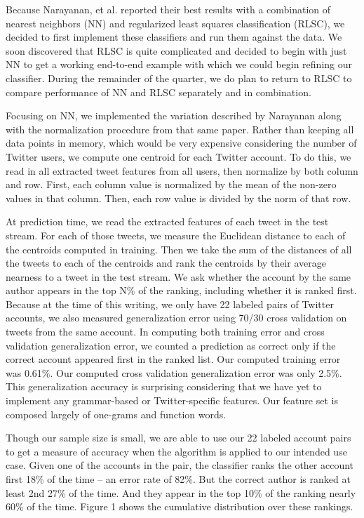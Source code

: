 \documentclass[10pt, conference, compsocconf]{IEEEtran}
\begin{document}
Because Narayanan, et al. reported their best results with a
combination of nearest neighbors (NN) and regularized least squares
classification (RLSC), we decided to first implement these classifiers
and run them against the data. We soon discovered that RLSC is quite
complicated and decided to begin with just NN to get a working
end-to-end example with which we could begin refining our
classifier. During the remainder of the quarter, we do plan to return
to RLSC to compare performance of NN and RLSC separately and in
combination.

Focusing on NN, we implemented the variation described by Narayanan
along with the normalization procedure from that same paper. Rather
than keeping all data points in memory, which would be very expensive
considering the number of Twitter users, we compute one centroid for
each Twitter account. To do this, we read in all extracted tweet
features from all users, then normalize by both column and row. First,
each column value is normalized by the mean of the non-zero values in
that column. Then, each row value is divided by the norm of that row.

At prediction time, we read the extracted features of each tweet in
the test stream. For each of those tweets, we measure the Euclidean
distance to each of the centroids computed in training. Then we take
the sum of the distances of all the tweets to each of the centroids
and rank the centroids by their average nearness to a tweet in the
test stream. We ask whether the account by the same author appears in
the top N\% of the ranking, including whether it is ranked
first. Because at the time of this writing, we only have 22 labeled
pairs of Twitter accounts, we also measured generalization error using
70/30 cross validation on tweets from the same account. In computing
both training error and cross validation generalization error, we
counted a prediction as correct only if the correct account appeared
first in the ranked list. Our computed training error was 0.61\%. Our
computed cross validation generalization error was only 2.5\%. This
generalization accuracy is surprising considering that we have yet to
implement any grammar-based or Twitter-specific features. Our feature
set is composed largely of one-grams and function words.

Though our sample size is small, we are able to use our 22 labeled
account pairs to get a measure of accuracy when the algorithm is
applied to our intended use case. Given one of the accounts in the
pair, the classifier ranks the other account first 18\% of the time --
an error rate of 82\%. But the correct author is ranked at least 2nd
27\% of the time. And they appear in the top 10\% of the ranking
nearly 60\% of the time. Figure 1 shows the cumulative distribution
over these rankings.
\end{document}
